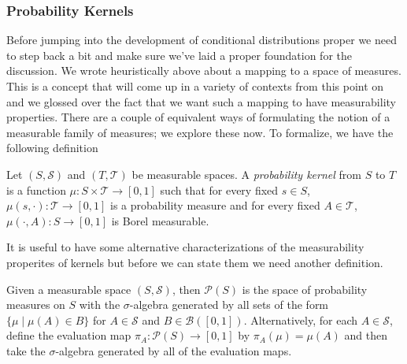 \subsubsection{Probability Kernels}
Before jumping into the development of conditional distributions
proper we need to step back a bit and make sure we've laid a proper
foundation for the discussion.  We wrote heuristically above about a
mapping to a space of measures.  This is a concept that will come up in a variety of contexts from this point
on and we glossed over the fact that we want such a mapping to have
measurability properties.  There are a couple of equivalent ways of
formulating the notion of a measurable family of measures;  we
explore these now.
To formalize, we have the following definition
\begin{defn}
Let $(S, \mathcal{S})$ and $(T, \mathcal{T})$ be measurable spaces.  A
\emph{probability kernel} from $S$ to $T$ is a function $\mu : S
\times \mathcal{T} \to [0,1]$ 
such that for every fixed $s \in S$, $\mu(s, \cdot) : \mathcal{T} \to
[0,1]$ is a probability measure and for every fixed $A \in
\mathcal{T}$, $\mu(\cdot, A) : S \to [0,1]$ is Borel measurable.
\end{defn}

It is useful to have some alternative characterizations of the
measurability properites of kernels but before we can state them we
need another definition.
\begin{defn}Given a measurable space $(S, \mathcal{S})$, then
  $\mathcal{P}(S)$ is the space of probability measures on $S$ with
  the $\sigma$-algebra generated by all sets of the form $\lbrace \mu
  \mid \mu(A) \in B \rbrace$ for $A \in \mathcal{S}$ and $B \in
  \mathcal{B}([0,1])$.  Alternatively, for each $A \in \mathcal{S}$,
  define the evaluation map $\pi_A : \mathcal{P}(S) \to [0,1]$ by
  $\pi_A(\mu) = \mu(A)$ and then take the $\sigma$-algebra generated
  by all of the evaluation maps.
\end{defn}

